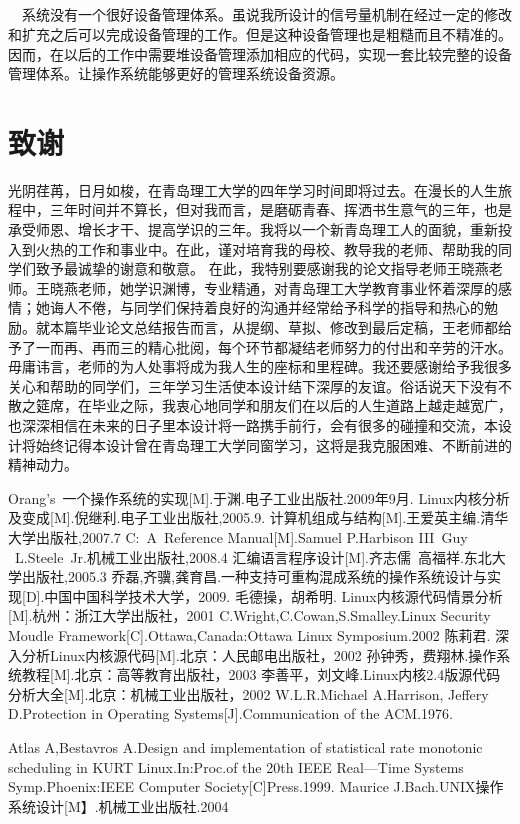 \documentclass[UTF8,nofonts,cs4size]{ctexrep}
\begin{document}
\paragraph{}
\indent \ \ 
系统没有一个很好设备管理体系。虽说我所设计的信号量机制在经过一定的修改和扩充之后可以完成设备管理的工作。但是这种设备管理也是粗糙而且不精准的。因而，在以后的工作中需要堆设备管理添加相应的代码，实现一套比较完整的设备管理体系。让操作系统能够更好的管理系统设备资源。
\chapter*{致谢}
光阴荏苒，日月如梭，在青岛理工大学的四年学习时间即将过去。在漫长的人生旅程中，三年时间并不算长，但对我而言，是磨砺青春、挥洒书生意气的三年，也是承受师恩、增长才干、提高学识的三年。我将以一个新青岛理工人的面貌，重新投入到火热的工作和事业中。在此，谨对培育我的母校、教导我的老师、帮助我的同学们致予最诚挚的谢意和敬意。 在此，我特别要感谢我的论文指导老师王晓燕老师。王晓燕老师，她学识渊博，专业精通，对青岛理工大学教育事业怀着深厚的感情；她诲人不倦，与同学们保持着良好的沟通并经常给予科学的指导和热心的勉励。就本篇毕业论文总结报告而言，从提纲、草拟、修改到最后定稿，王老师都给予了一而再、再而三的精心批阅，每个环节都凝结老师努力的付出和辛劳的汗水。毋庸讳言，老师的为人处事将成为我人生的座标和里程碑。我还要感谢给予我很多关心和帮助的同学们，三年学习生活使本设计结下深厚的友谊。俗话说天下没有不散之筵席，在毕业之际，我衷心地同学和朋友们在以后的人生道路上越走越宽广，也深深相信在未来的日子里本设计将一路携手前行，会有很多的碰撞和交流，本设计将始终记得本设计曾在青岛理工大学同窗学习，这将是我克服困难、不断前进的精神动力。
\label{exception}
\begin{thebibliography}{99}
Orang's\ 一个操作系统的实现[M].于渊.电子工业出版社.2009年9月.
Linux内核分析及变成[M].倪继利.电子工业出版社,2005.9.
计算机组成与结构[M].王爱英主编.清华大学出版社,2007.7
C:\ A\ Reference Manual[M].Samuel P.Harbison III\ Guy \ L.Steele\ Jr.机械工业出版社,2008.4
\bibitem{asseme}汇编语言程序设计[M].齐志儒\ 高福祥.东北大学出版社,2005.3
乔磊,齐骥,龚育昌.一种支持可重构混成系统的操作系统设计与实现[D].中国中国科学技术大学，2009.
毛德操，胡希明. Linux内核源代码情景分析[M].杭州：浙江大学出版社，2001
C.Wright,C.Cowan,S.Smalley.Linux Security Moudle Framework[C].Ottawa,Canada:Ottawa Linux Symposium.2002
\bibitem{3}陈莉君. 深入分析Linux内核源代码[M].北京：人民邮电出版社，2002
孙钟秀，费翔林.操作系统教程[M].北京：高等教育出版社，2003
李善平，刘文峰.Linux内核2.4版源代码分析大全[M].北京：机械工业出版社，2002
W.L.R.Michael A.Harrison, Jeffery D.Protection in Operating Systems[J].Communication of the ACM.1976.

Atlas A,Bestavros A.Design and implementation of statistical rate monotonic scheduling in KURT Linux.In:Proc.of the 20th IEEE Real—Time Systems Symp.Phoenix:IEEE Computer Society[C]Press.1999.
\bibitem{8}Maurice J.Bach.UNIX操作系统设计[M】.机械工业出版社.2004
\end{thebibliography}
\appendix
\end{document}
